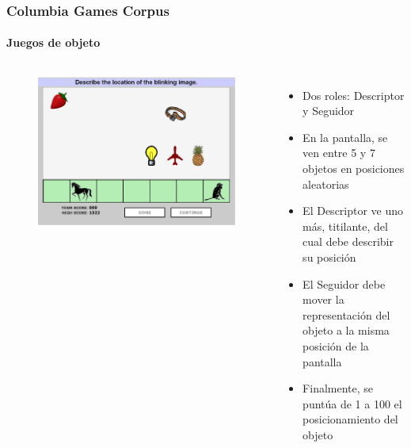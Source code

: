 \begin{frame}
  \frametitle{Columbia Games Corpus}
  \framesubtitle{Juegos de objeto}
  \begin{columns}
      \begin{figure}
        \includegraphics[width=\textwidth]{images/columbia_games_color.jpg}
      \end{figure}


    \begin{itemize}
      \item Dos roles: Descriptor y Seguidor
      \item En la pantalla, se ven entre 5 y 7 objetos en posiciones aleatorias
      \item El Descriptor ve uno más, titilante, del cual debe describir su posición
      \item El Seguidor debe mover la representación del objeto a la misma posición de la pantalla
      \item Finalmente, se puntúa de 1 a 100 el posicionamiento del objeto
    \end{itemize}
  \end{columns}
\end{frame}





